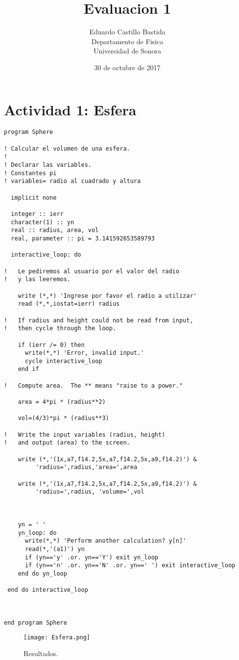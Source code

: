 \documentclass{article}
\title{Evaluacion 1}
\author{Eduardo Castillo Bastida\\
Departamento de Fisica \\
Universidad de Sonora}
\date{30 de octubre de 2017}
\begin{document}
\maketitle
\clearpage

\section{Actividad 1: Esfera}
\begin{verbatim}
program Sphere

! Calcular el volumen de una esfera.
!
! Declarar las variables.
! Constantes pi
! variables= radio al cuadrado y altura

  implicit none    

  integer :: ierr
  character(1) :: yn
  real :: radius, area, vol
  real, parameter :: pi = 3.141592653589793

  interactive_loop: do

!   Le pediremos al usuario por el valor del radio
!   y las leeremos.

    write (*,*) 'Ingrese por favor el radio a utilizar'
    read (*,*,iostat=ierr) radius

!   If radius and height could not be read from input,
!   then cycle through the loop.

    if (ierr /= 0) then
      write(*,*) 'Error, invalid input.'
      cycle interactive_loop
    end if

!   Compute area.  The ** means "raise to a power."

    area = 4*pi * (radius**2)

    vol=(4/3)*pi * (radius**3)

!   Write the input variables (radius, height)
!   and output (area) to the screen.

    write (*,'(1x,a7,f14.2,5x,a7,f14.2,5x,a9,f14.2)') &
         'radius=',radius,'area=',area
    
    write (*,'(1x,a7,f14.2,5x,a7,f14.2,5x,a9,f14.2)') &
         'radius=',radius, 'volume=',vol
        
    

    yn = ' '
    yn_loop: do
      write(*,*) 'Perform another calculation? y[n]'
      read(*,'(a1)') yn
      if (yn=='y' .or. yn=='Y') exit yn_loop
      if (yn=='n' .or. yn=='N' .or. yn==' ') exit interactive_loop
    end do yn_loop

 end do interactive_loop

 

end program Sphere
\end{verbatim}
\begin{figure}[htbp]
\centering
\texttt{[image: Esfera.png]}
\caption{Resultados.}\label{fig:figura1}
\end{figure}
\end{document}
